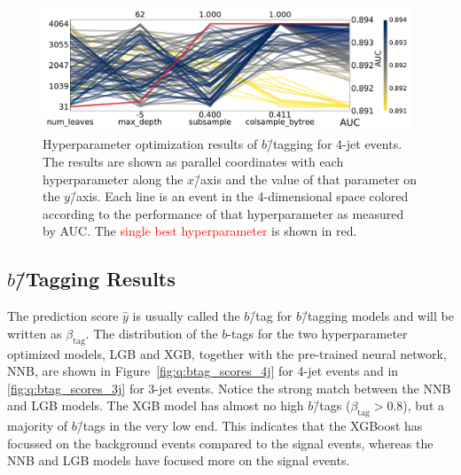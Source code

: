 \begin{figure}
  \includegraphics[width=0.98\textwidth, trim=0 0 0 0, clip]{figures/quarks/CV_viz-njet=4-name=lf_lgb_down_sample=1.00-ML_vars=vertex-selection=b-ejet_min=4-n_iter_RS_lgb=99-n_iter_RS_xgb=9-cdot_cut=0.90-version=19.pdf}
  \caption[Parallel Plot of HPO Results for 4-Jet $b$\=/Tagging]
          {Hyperparameter optimization results of $b$\=/tagging for 4-jet events. The results are shown as parallel coordinates with each hyperparameter along the $x$\=/axis and the value of that parameter on the $y$\=/axis. Each line is an event in the 4-dimensional space colored according to the performance of that hyperparameter as measured by AUC. The \textcolor{red}{single best hyperparameter} is shown in red. 
          } 
  \label{fig:q:initial_CV_res_parallel_coords_4j}
\end{figure}

\subsection{$b$\=/Tagging Results}

The prediction score $\hat{y}$ is usually called the $b$\=/tag for $b$\=/tagging models and will be written as $\beta_\mathrm{tag}$. The distribution of the $b$-tags for the two hyperparameter optimized models, LGB and XGB, together with the pre-trained neural network, NNB, are shown in Figure~\ref{fig:q:btag_scores_4j} for 4-jet events and in \ref{fig:q:btag_scores_3j} for 3-jet events. Notice the strong match between the NNB and LGB models. The XGB model has almost no high $b$\=/tags ($\beta_\mathrm{tag} > 0.8$), but a majority of $b$\=/tags in the very low end. This indicates that the XGBoost has focussed on the background events compared to the signal events, whereas the NNB and LGB models have focused more on the signal events. 

